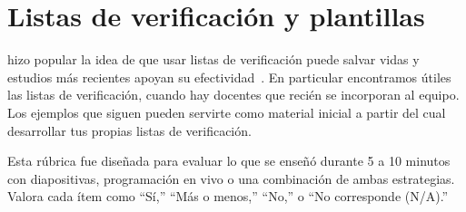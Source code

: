 \chapter{Listas de verificación y plantillas}\label{s:checklist}

\cite{Gawa2007} hizo popular la idea de que usar listas de verificación puede salvar vidas
y estudios más recientes apoyan su efectividad~\cite{Avel2013,Urba2014,Rams2019}.
En particular encontramos útiles las listas de verificación,
cuando hay docentes que recién se incorporan al equipo.
Los ejemplos que siguen pueden servirte como material inicial a partir del cual desarrollar tus propias listas de verificación.


Esta rúbrica fue diseñada para evaluar lo que se enseñó durante 5 a 10 minutos
con diapositivas, programación en vivo o una combinación de ambas estrategias.
Valora cada ítem como ``Sí,'' ``Más o menos,'' ``No,'' o ``No corresponde (N/A).''

